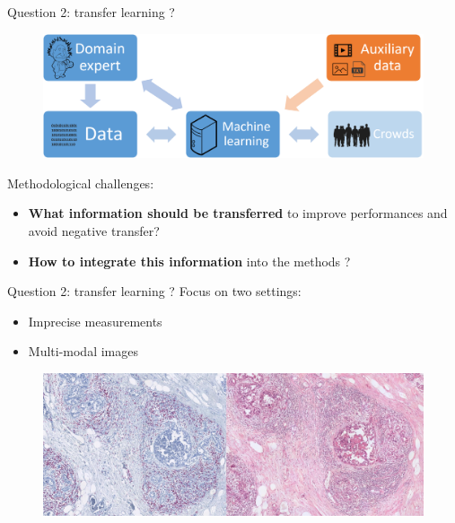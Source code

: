 \documentclass{beamer}
\begin{document}
\begin{frame}{Question 2: transfer learning ?}
	
	\begin{figure}
		\includegraphics[scale=0.30]{images/ml_expert_crowds_aux.png}
	\end{figure}
	
	\vfill
	
	Methodological challenges:
	\begin{itemize}
		\item \textbf{What information should be transferred} to improve performances and avoid negative transfer? 
		\item \textbf{How to integrate this information} into the methods ? 
	\end{itemize}
	
\end{frame}

\begin{frame}{Question 2: transfer learning ?}	
	Focus on two settings:
	
	\begin{itemize}
		\item Imprecise measurements 
		\item Multi-modal images
	\end{itemize}

	\begin{figure}
		\center
		\includegraphics[scale=0.14]{images/multimodal.png}
	\end{figure}	
\end{frame}
\end{document}
